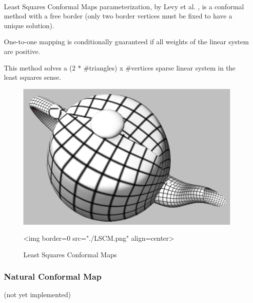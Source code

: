   \\

Least Squares Conformal Maps parameterization, by Levy et al.
\cite{cgal:lprm-lscm-02}, is a conformal method with a free
border (only two border vertices must be fixed to have a unique solution).

One-to-one mapping is conditionally guaranteed if all weights
of the linear system are positive.

This method solves a (2 * \#triangles) x \#vertices sparse linear system
in the least squares sense.

\begin{figure}[bht]
    \begin{center}
        \begin{ccTexOnly}
            \includegraphics{Parameterization/LSCM} %
        \end{ccTexOnly}
        \begin{ccHtmlOnly}
            <img border=0 src="./LSCM.png" align=center>
        \end{ccHtmlOnly}
        \label{parameterization-fig-LSCM}

        \caption{Least Squares Conformal Maps}
    \end{center}
\end{figure}


\subsubsection{Natural Conformal Map}

(not yet implemented)

